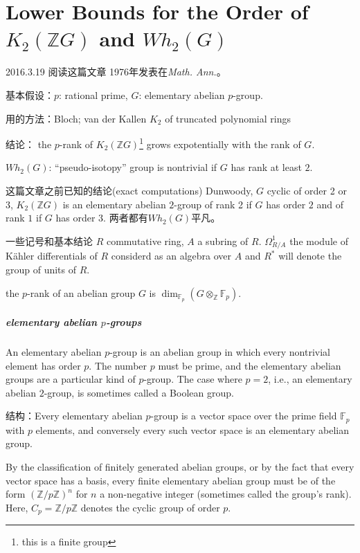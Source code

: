\chapter{Lower Bounds for the Order of $K_2(\mathbb{Z}G)$ and $Wh_2(G)$} %
\label{cha:lower_bounds_for_the_order_of_}
2016.3.19 阅读这篇文章\cite{Stein1976} 1976年发表在{\em{Math. Ann.}}。

基本假设：$p$: rational prime, $G$: elementary abelian $p$-group.

用的方法：Bloch; van der Kallen  $K_2$ of truncated polynomial rings

结论：
the $p$-rank of $K_2(\mathbb{Z}G)$\footnote{this is a finite group} grows expotentially with the rank of $G$.

$Wh_2(G)$: ``pseudo-isotopy'' group is nontrivial if $G$ has rank at least $2$.


这篇文章之前已知的结论(exact computations)
Dunwoody, $G$ cyclic of order 2 or 3, {\color{green} $K_2(\mathbb{Z}G)$ is an elementary abelian $2$-group of rank 2 if $G$ has order $2$ and of rank $1$ if $G$ has order $3$}. 两者都有$Wh_2(G)$平凡。


一些记号和基本结论
$R$ commutative ring, $A$ a subring of $R$.
$\Omega_{R/A}^1$ the module of K\"{a}hler differentials of $R$ considerd as an algebra over $A$ and $R^*$ will denote the group of units of $R$.

the $p$-rank of an abelian group $G$ is $\dim_{\mathbb{F}_p}(G\otimes_\mathbb{Z} \mathbb{F}_p)$.

\paragraph{elementary abelian $p$-groups} %
\label{par:elementary_}An elementary abelian $p$-group is an abelian group in which every nontrivial element has order $p$. The number $p$ must be prime, and the elementary abelian groups are a particular kind of $p$-group. The case where $p = 2$, i.e., an elementary abelian $2$-group, is sometimes called a Boolean group.

结构：Every elementary abelian $p$-group is a vector space over the prime field $\mathbb{F}_p$ with $p$ elements, and conversely every such vector space is an elementary abelian group.

By the classification of finitely generated abelian groups, or by the fact that every vector space has a basis, every finite elementary abelian group must be of the form $(\mathbb{Z}/p \mathbb{Z})^n$ for $n$ a non-negative integer (sometimes called the group's rank). Here, $C_p=\mathbb{Z}/p \mathbb{Z}$ denotes the cyclic group of order $p$.

